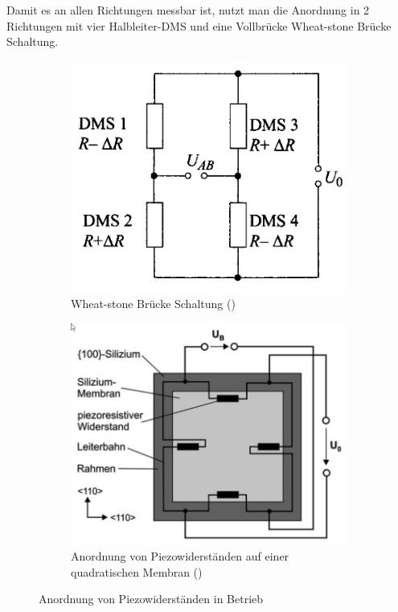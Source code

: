 \documentclass[12pt]{article}
\begin{document}
Damit es an allen Richtungen messbar ist, nutzt man die Anordnung in 2 Richtungen mit vier Halbleiter-DMS und eine Vollbrücke Wheat-stone Brücke Schaltung. 
\begin{figure}[h!]
  \centering
  \begin{subfigure}[b]{0.4\linewidth}
    \includegraphics[width=\linewidth]{vollbruecke}
    \caption{Wheat-stone Brücke Schaltung (\cite{Parthier.2006})}
  \end{subfigure}
  \begin{subfigure}[b]{0.4\linewidth}
    \includegraphics[width=\linewidth]{anordnungpiezoresistiv}
    \caption{Anordnung von Piezowiderständen auf einer quadratischen Membran (\cite{Buttgenbach.2016})}
  \end{subfigure}
  \caption{Anordnung von Piezowiderständen in Betrieb}
  \label{fig:anordnung}
\end{figure}
\end{document}
